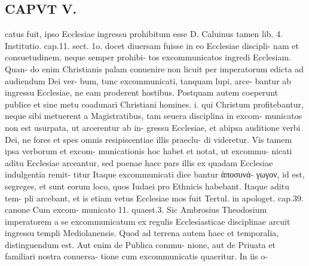 \documentclass{article}
\begin{document}
\begin{pages}
\section*{CAPVT  V. }catus fuit, ipso Ecclesiae ingressu prohibitum esse D. Caluinus tamen lib. 4. Institutio. cap.11. sect. 1o. docet diuersam fuisse in eo Ecclesiae discipli- nam et consuetudinem, neque semper prohibi- tos excommunicatos ingredi Ecclesiam. Quan- do enim Christianis palam conuenire non licuit per imperatorum edicta ad audiendum Dei ver- bum, tunc excommunicati, tanquam lupi, arce- bantur ab ingressu Ecclesiae, ne eam proderent hostibus. Postquam autem coeperunt publice et sine metu coadunari Christiani homines. i. qui Christum profitebantur, neque sibi metuerent a Magistratibus, tam seuera disciplina in excom- municatos non est usurpata, ut arcerentur ab in- gressu Ecclesiae, et abipsa auditione verbi Dei, ne fores et spes omnis resipiscentiae illis praeclu- di videretur. Vis tamem ipsa verborum et excom- municationis hoc habet et notat, ut excommu- nicati aditu Ecclesiae arceantur, sed poenae haec pars illis ex quadam Ecclesiae indulgentia remit- titur Itaque excommunicati dice bantur ἀποσυνά- γωγον, id est, segreges, et sunt eorum loco, quos Iudaei pro Ethnicis habebant. Itaque aditu tem- pli arcebant, et is etiam vetus Ecclesiae mos fuit Tertul. in apologet. cap.39. canone Cum excom- municato 11. quaest.3. Sic Ambrosius Theodosium imperatorem a se excommunicatum ex regulis Ecclesiasticae disciplinae arcuit ingressu templi Mediolanensis. Quod ad terrena autem haec et temporalia, distinguendum est. Aut enim de Publica commu- nione, aut de Priuata et familiari nostra conuersa- tione cum excommunicatis quaeritur. In iis o- 

\end{pages}
\end{document}

